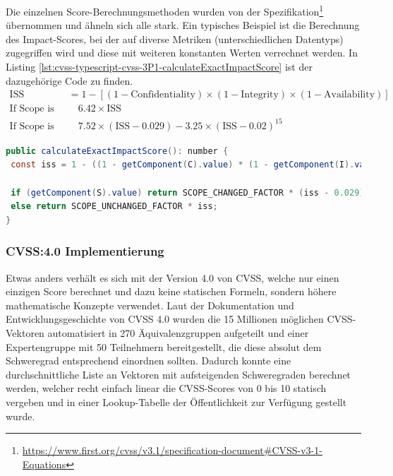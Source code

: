 Die einzelnen Score-Berechnungsmethoden wurden von der Spezifikation\footnote{\url{https://www.first.org/cvss/v3.1/specification-document#CVSS-v3-1-Equations}} übernommen und ähneln sich alle stark.
Ein typisches Beispiel ist die Berechnung des Impact-Scores, bei der auf diverse Metriken (unterschiedlichen Datentyps) zugegriffen wird und diese mit weiteren konstanten Werten verrechnet werden.
In Listing \ref{lst:cvss-typescript-cvss-3P1-calculateExactImpactScore} ist der dazugehörige Code zu finden.
\begin{align*}
    \text{ISS} &= 1 - [ (1 - \text{Confidentiality}) \times (1 - \text{Integrity}) \times (1 - \text{Availability}) ] \\
    \text{If Scope is Unchanged:} & \quad 6.42 \times \text{ISS} \\
    \text{If Scope is Changed:} & \quad 7.52 \times (\text{ISS} - 0.029) - 3.25 \times (\text{ISS} - 0.02)^{15}
\end{align*}

\begin{lstlisting}[language=Java, label={lst:cvss-typescript-cvss-3P1-calculateExactImpactScore}, caption={CVSS 3.1 Impact Score-Berechnung in TypeScript}]
public calculateExactImpactScore(): number {
 const iss = 1 - ((1 - getComponent(C).value) * (1 - getComponent(I).value) * (1 - getComponent(A).value));

 if (getComponent(S).value) return SCOPE_CHANGED_FACTOR * (iss - 0.029) - 3.25 * Math.pow(iss - 0.02, 15);
 else return SCOPE_UNCHANGED_FACTOR * iss;
}
\end{lstlisting}

\subsubsection{CVSS:4.0 Implementierung} \label{subsec:projektbericht-loesungsweg-typescript-cvss-online-calculator-cvss-4P0}

Etwas anders verhält es sich mit der Version 4.0 von CVSS, welche nur einen einzigen Score berechnet und dazu keine statischen Formeln, sondern höhere mathematische Konzepte verwendet.
Laut der Dokumentation und Entwicklungsgeschichte von CVSS 4.0 \cite{CVSSv4.0Specification} wurden die 15 Millionen möglichen CVSS-Vektoren automatisiert in 270 Äquivalenzgruppen aufgeteilt und einer Expertengruppe mit 50 Teilnehmern bereitgestellt, die diese absolut dem Schweregrad entsprechend einordnen sollten.
Dadurch konnte eine durchschnittliche Liste an Vektoren mit aufsteigenden Schweregraden berechnet werden, welcher recht einfach linear die CVSS-Scores von 0 bis 10 statisch vergeben und in einer Lookup-Tabelle der Öffentlichkeit zur Verfügung gestellt wurde.

